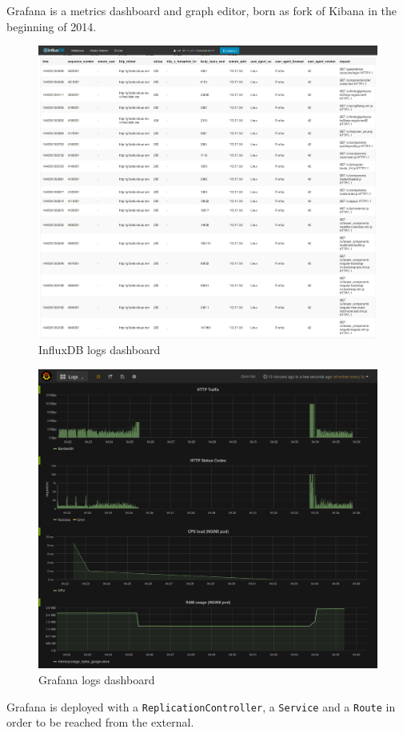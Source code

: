 Grafana is a metrics dashboard and graph editor, born as fork of Kibana
in the beginning of 2014.

\begin{figure}[htbp]
\centering
\includegraphics{media/ch6-influxdb.png}
\caption{InfluxDB logs dashboard}
\end{figure}

\begin{figure}[htbp]
\centering
\includegraphics{media/ch6-grafana.png}
\caption{Grafana logs dashboard}
\end{figure}

Grafana is deployed with a \texttt{ReplicationController}, a
\texttt{Service} and a \texttt{Route} in order to be reached from the
external.
